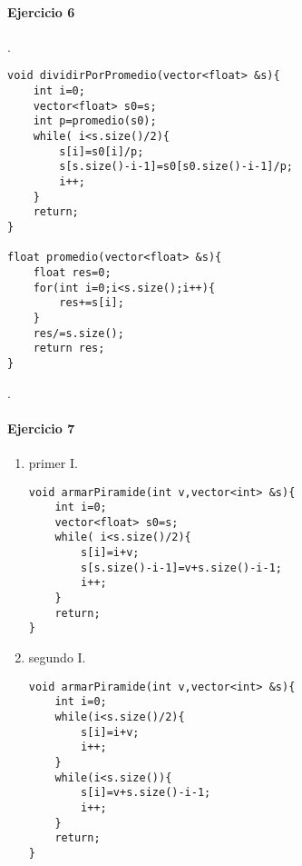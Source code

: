 \documentclass{article}
\begin{document}
\paragraph*{Ejercicio 6}.

\begin{lstlisting}
void dividirPorPromedio(vector<float> &s){
	int i=0;
	vector<float> s0=s;
	int p=promedio(s0);
	while( i<s.size()/2){
		s[i]=s0[i]/p;
		s[s.size()-i-1]=s0[s0.size()-i-1]/p;
		i++;
	}
	return;
}

float promedio(vector<float> &s){
	float res=0;
	for(int i=0;i<s.size();i++){
		res+=s[i];	
	}
	res/=s.size();
	return res;
}
\end{lstlisting}

.
\paragraph*{Ejercicio 7}
\begin{enumerate}[label=\alph*)]
\item primer I.\\
\begin{lstlisting}
void armarPiramide(int v,vector<int> &s){
	int i=0;
	vector<float> s0=s;
	while( i<s.size()/2){
		s[i]=i+v;
		s[s.size()-i-1]=v+s.size()-i-1;
		i++;
	}
	return;
}
\end{lstlisting}
\item segundo I.\\
 \begin{lstlisting}
void armarPiramide(int v,vector<int> &s){
	int i=0;
	while(i<s.size()/2){
		s[i]=i+v;
		i++;	
	}
	while(i<s.size()){
		s[i]=v+s.size()-i-1;
		i++;	
	}
	return;
}
\end{lstlisting}
\end{enumerate}
\end{document}
